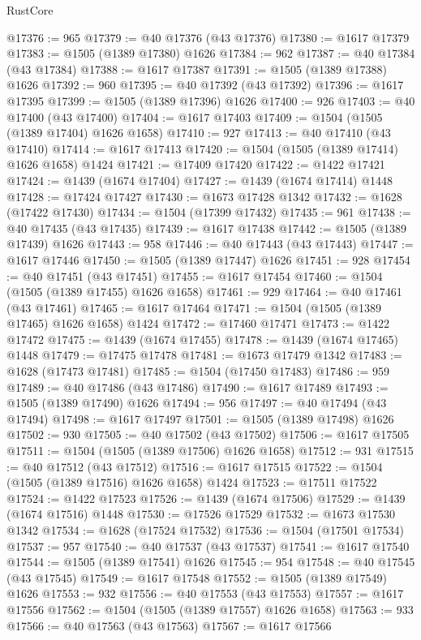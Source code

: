 \begin{lexlean}{RustCore}
\begin{coremodule}
@17376 := 965
@17379 := @40 @17376 (@43 @17376)
@17380 := @1617 @17379
@17383 := @1505 (@1389 @17380) @1626
@17384 := 962
@17387 := @40 @17384 (@43 @17384)
@17388 := @1617 @17387
@17391 := @1505 (@1389 @17388) @1626
@17392 := 960
@17395 := @40 @17392 (@43 @17392)
@17396 := @1617 @17395
@17399 := @1505 (@1389 @17396) @1626
@17400 := 926
@17403 := @40 @17400 (@43 @17400)
@17404 := @1617 @17403
@17409 := @1504 (@1505 (@1389 @17404) @1626 @1658)
@17410 := 927
@17413 := @40 @17410 (@43 @17410)
@17414 := @1617 @17413
@17420 := @1504 (@1505 (@1389 @17414) @1626 @1658) @1424
@17421 := @17409 @17420
@17422 := @1422 @17421
@17424 := @1439 (@1674 @17404)
@17427 := @1439 (@1674 @17414) @1448
@17428 := @17424 @17427
@17430 := @1673 @17428 @1342
@17432 := @1628 (@17422 @17430)
@17434 := @1504 (@17399 @17432)
@17435 := 961
@17438 := @40 @17435 (@43 @17435)
@17439 := @1617 @17438
@17442 := @1505 (@1389 @17439) @1626
@17443 := 958
@17446 := @40 @17443 (@43 @17443)
@17447 := @1617 @17446
@17450 := @1505 (@1389 @17447) @1626
@17451 := 928
@17454 := @40 @17451 (@43 @17451)
@17455 := @1617 @17454
@17460 := @1504 (@1505 (@1389 @17455) @1626 @1658)
@17461 := 929
@17464 := @40 @17461 (@43 @17461)
@17465 := @1617 @17464
@17471 := @1504 (@1505 (@1389 @17465) @1626 @1658) @1424
@17472 := @17460 @17471
@17473 := @1422 @17472
@17475 := @1439 (@1674 @17455)
@17478 := @1439 (@1674 @17465) @1448
@17479 := @17475 @17478
@17481 := @1673 @17479 @1342
@17483 := @1628 (@17473 @17481)
@17485 := @1504 (@17450 @17483)
@17486 := 959
@17489 := @40 @17486 (@43 @17486)
@17490 := @1617 @17489
@17493 := @1505 (@1389 @17490) @1626
@17494 := 956
@17497 := @40 @17494 (@43 @17494)
@17498 := @1617 @17497
@17501 := @1505 (@1389 @17498) @1626
@17502 := 930
@17505 := @40 @17502 (@43 @17502)
@17506 := @1617 @17505
@17511 := @1504 (@1505 (@1389 @17506) @1626 @1658)
@17512 := 931
@17515 := @40 @17512 (@43 @17512)
@17516 := @1617 @17515
@17522 := @1504 (@1505 (@1389 @17516) @1626 @1658) @1424
@17523 := @17511 @17522
@17524 := @1422 @17523
@17526 := @1439 (@1674 @17506)
@17529 := @1439 (@1674 @17516) @1448
@17530 := @17526 @17529
@17532 := @1673 @17530 @1342
@17534 := @1628 (@17524 @17532)
@17536 := @1504 (@17501 @17534)
@17537 := 957
@17540 := @40 @17537 (@43 @17537)
@17541 := @1617 @17540
@17544 := @1505 (@1389 @17541) @1626
@17545 := 954
@17548 := @40 @17545 (@43 @17545)
@17549 := @1617 @17548
@17552 := @1505 (@1389 @17549) @1626
@17553 := 932
@17556 := @40 @17553 (@43 @17553)
@17557 := @1617 @17556
@17562 := @1504 (@1505 (@1389 @17557) @1626 @1658)
@17563 := 933
@17566 := @40 @17563 (@43 @17563)
@17567 := @1617 @17566

\end{coremodule}
\end{lexlean}
